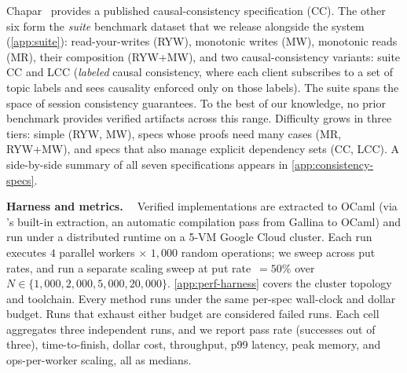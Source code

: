Chapar~\cite{chapar} provides a published causal-consistency specification (CC). The other six form the \emph{\sys{} suite} benchmark dataset that we release alongside the system (\cref{app:suite}): read-your-writes (RYW), monotonic writes (MW), monotonic reads (MR), their composition (RYW+MW), and two causal-consistency variants: \sys{} suite CC and LCC (\emph{labeled} causal consistency, where each client subscribes to a set of topic labels and sees causality enforced only on those labels). The \sys{} suite spans the space of session consistency guarantees. To the best of our knowledge, no prior benchmark provides verified \coq{} artifacts across this range.
% 
Difficulty grows in three tiers: simple (RYW, MW), specs whose proofs need many cases (MR, RYW+MW), and specs that also manage explicit dependency sets (CC, LCC).
A side-by-side summary of all seven specifications appears in \cref{app:consistency-specs}.

\textbf{Harness and metrics. \ }
Verified \coq{} implementations are extracted to OCaml (via \coq{}'s built-in extraction, an automatic compilation pass from Gallina to OCaml) and run under a distributed runtime on a 5-VM Google Cloud cluster. Each run executes $4$ parallel workers $\times$ $1{,}000$ random operations; we sweep across put rates, and run a separate scaling sweep at put rate~$=50\%$ over $N \in \{1{,}000, 2{,}000, 5{,}000, 20{,}000\}$. \cref{app:perf-harness} covers the cluster topology and toolchain.
% 
Every method runs under the same per-spec wall-clock and dollar budget. Runs that exhaust either budget are considered failed runs. 
Each cell aggregates three independent runs, and we report pass rate 
(successes out of three), 
time-to-finish, dollar cost, throughput, p99 latency, peak memory, and ops-per-worker scaling, all as medians.

